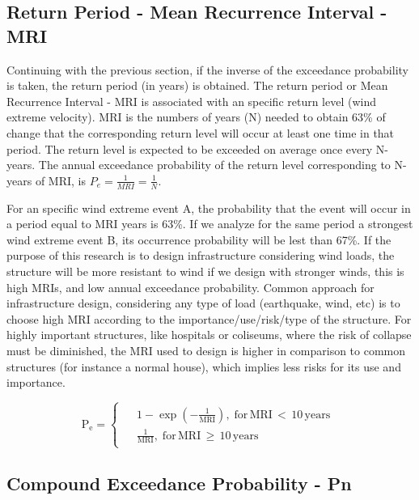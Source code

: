 \documentclass[12pt,oneside]{reedthesis}
\begin{document}
\hypertarget{return-period---mean-recurrence-interval---mri}{%
\subsection{Return Period - Mean Recurrence Interval - MRI}\label{return-period---mean-recurrence-interval---mri}}

Continuing with the previous section, if the inverse of the exceedance probability is taken, the return period (in years) is obtained. The return period or Mean Recurrence Interval - MRI is associated with an specific return level (wind extreme velocity). MRI is the numbers of years (N) needed to obtain 63\% of change that the corresponding return level will occur at least one time in that period. The return level is expected to be exceeded on average once every N-years. The annual exceedance probability of the return level corresponding to N-years of MRI, is \(P_e=\frac{1}{MRI}=\frac{1}{N}\).

For an specific wind extreme event A, the probability that the event will occur in a period equal to MRI years is 63\%. If we analyze for the same period a strongest wind extreme event B, its occurrence probability will be lest than 67\%. If the purpose of this research is to design infrastructure considering wind loads, the structure will be more resistant to wind if we design with stronger winds, this is high MRIs, and low annual exceedance probability. Common approach for infrastructure design, considering any type of load (earthquake, wind, etc) is to choose high MRI according to the importance/use/risk/type of the structure. For highly important structures, like hospitals or coliseums, where the risk of collapse must be diminished, the MRI used to design is higher in comparison to common structures (for instance a normal house), which implies less risks for its use and importance.

\[
  \mathrm{
    P_e = 
    \begin{cases}
      \begin{split}
            &1-\exp\left(-\frac{1}{MRI}\right),\;for\,MRI\,<\,10\,years
            \\
            &\frac{1}{MRI},\;for\,MRI\,\geq\,10\,years      
      \end{split}
    \end{cases}
  }
\]

\hypertarget{compound-exceedance-probability---pn}{%
\subsection{Compound Exceedance Probability - Pn}\label{compound-exceedance-probability---pn}}
\end{document}
